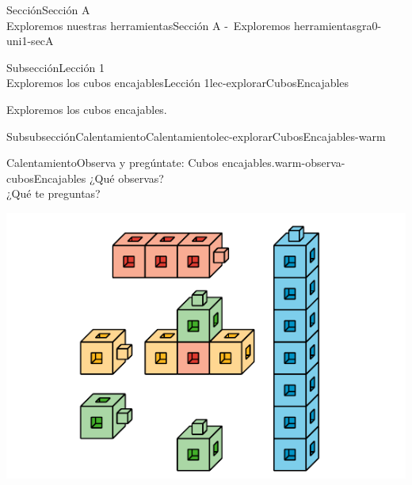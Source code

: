 \clearpage
\setcounter{tocdepth}{2}
\renewcommand{\contentsname}{Tabla de contenido}
\tableofcontents
%
\typeout{************************************************}
\typeout{************************************************}
%
\begin{sectionptx}{Sección}{{\Large Sección A\\}Exploremos nuestras herramientas}{}{Sección A -~Exploremos herramientas}{}{}{gra0-uni1-secA}
%
%
\typeout{************************************************}
\typeout{************************************************}
%
\begin{subsectionptx}{Subsección}{{\normalsize Lección 1\\[-0.05cm]}Exploremos los cubos encajables}{}{Lección 1}{}{}{lec-explorarCubosEncajables}
\begin{introduction}{}%
Exploremos los cubos encajables.%
\end{introduction}%
%
%
\typeout{************************************************}
\typeout{************************************************}
%
\begin{subsubsectionptx}{Subsubsección}{Calentamiento}{}{Calentamiento}{}{}{lec-explorarCubosEncajables-warm}
\begin{exploration}{Calentamiento}{Observa y pregúntate: Cubos encajables.}{warm-observa-cubosEncajables}%
¿Qué observas?\\
¿Qué te preguntas?\begin{image}{0}{1}{0}{}%
\includegraphics[width=\linewidth, center]{external/svg-source/tikz-file-147993.pdf}

\end{image}
\end{exploration}
\end{subsubsectionptx}
\end{subsectionptx}
\end{sectionptx}
